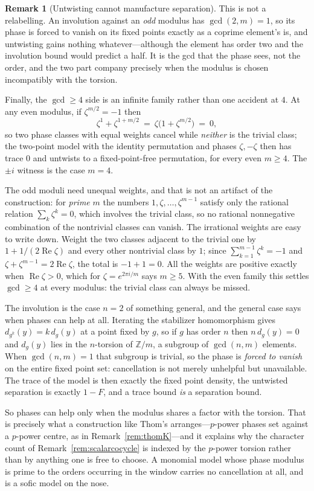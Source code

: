 \documentclass[11pt]{amsart}
\theoremstyle{definition}
\newtheorem{remark}[theorem]{Remark}
\theoremstyle{plain}
\newcommand{\Z}{\mathbb Z}
\begin{document}
\begin{remark}[Untwisting cannot manufacture separation]
This is not a relabelling.  An involution against an \emph{odd} modulus has \(\gcd(2,m)=1\), so its phase is forced to vanish on its fixed points exactly as a coprime element's is, and untwisting gains nothing whatever---although the element has order two and the involution bound would predict a half.  It is the gcd that the phase sees, not the order, and the two part company precisely when the modulus is chosen incompatibly with the torsion.

Finally, the \(\gcd\geq4\) side is an infinite family rather than one accident at \(4\).  At any even modulus, if \(\zeta^{m/2}=-1\) then
\[
 \zeta^{1}+\zeta^{1+m/2}\ =\ \zeta\bigl(1+\zeta^{m/2}\bigr)\ =\ 0,
\]
so two phase classes with equal weights cancel while \emph{neither} is the trivial class; the two-point model with the identity permutation and phases \(\zeta,-\zeta\) then has trace \(0\) and untwists to a fixed-point-free permutation, for every even \(m\geq4\).  The \(\pm i\) witness is the case \(m=4\).

The odd moduli need unequal weights, and that is not an artifact of the construction: for \emph{prime} \(m\) the numbers \(1,\zeta,\dots,\zeta^{m-1}\) satisfy only the rational relation \(\sum_k\zeta^k=0\), which involves the trivial class, so no rational nonnegative combination of the nontrivial classes can vanish.  The irrational weights are easy to write down.  Weight the two classes adjacent to the trivial one by \(1+1/(2\operatorname{Re}\zeta)\) and every other nontrivial class by \(1\); since \(\sum_{k=1}^{m-1}\zeta^k=-1\) and \(\zeta+\zeta^{m-1}=2\operatorname{Re}\zeta\), the total is \(-1+1=0\).  All the weights are positive exactly when \(\operatorname{Re}\zeta>0\), which for \(\zeta=e^{2\pi i/m}\) says \(m\geq5\).  With the even family this settles \(\gcd\geq4\) at every modulus: the trivial class can always be missed.

The involution is the case \(n=2\) of something general, and the general case says when phases can help at all.  Iterating the stabilizer homomorphism gives \(d_{g^k}(y)=k\,d_g(y)\) at a point fixed by \(g\), so if \(g\) has order \(n\) then \(n\,d_g(y)=0\) and \(d_g(y)\) lies in the \(n\)-torsion of \(\Z/m\), a subgroup of \(\gcd(n,m)\) elements.  When \(\gcd(n,m)=1\) that subgroup is trivial, so the phase is \emph{forced to vanish} on the entire fixed point set: cancellation is not merely unhelpful but unavailable.  The trace of the model is then exactly the fixed point density, the untwisted separation is exactly \(1-F\), and a trace bound \emph{is} a separation bound.

So phases can help only when the modulus shares a factor with the torsion.  That is precisely what a construction like Thom's arranges---\(p\)-power phases set against a \(p\)-power centre, as in Remark~\ref{rem:thomK}---and it explains why the character count of Remark~\ref{rem:scalarcocycle} is indexed by the \(p\)-power torsion rather than by anything one is free to choose.  A monomial model whose phase modulus is prime to the orders occurring in the window carries no cancellation at all, and is a sofic model on the nose.
\end{remark}
\end{document}
